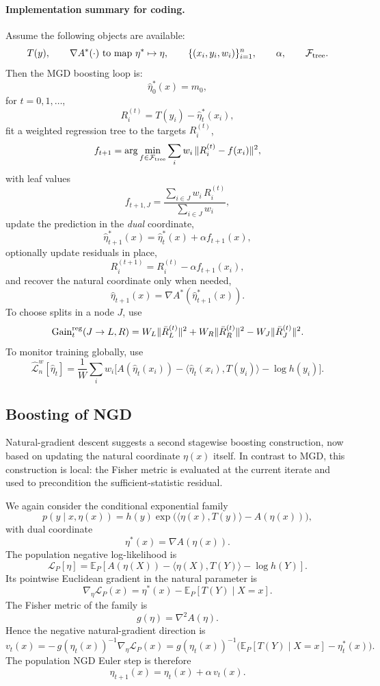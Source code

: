 \documentclass[11pt]{article}
\begin{document}
\paragraph{Implementation summary for coding.}
Assume the following objects are available:
\[
T(y),\qquad
\nabla A^\ast(\cdot)\ \text{to map }\eta^\ast\mapsto \eta,\qquad
\{(x_i,y_i,w_i)\}_{i=1}^n,\qquad
\alpha,\qquad
\mathcal F_{\rm tree}.
\]
Then the MGD boosting loop is:
\[
\hat\eta_0^\ast(x)=m_0,
\]
for \(t=0,1,\dots\),
\[
R_i^{(t)}=T(y_i)-\hat\eta_t^\ast(x_i),
\]
fit a weighted regression tree to the targets \(R_i^{(t)}\),
\[
f_{t+1}
=
\arg\min_{f\in\mathcal F_{\rm tree}}
\sum_i w_i\,\|R_i^{(t)}-f(x_i)\|^2,
\]
with leaf values
\[
f_{t+1,J}=\frac{\sum_{i\in J}w_i\,R_i^{(t)}}{\sum_{i\in J}w_i},
\]
update the prediction in the \emph{dual} coordinate,
\[
\hat\eta_{t+1}^\ast(x)=\hat\eta_t^\ast(x)+\alpha f_{t+1}(x),
\]
optionally update residuals in place,
\[
R_i^{(t+1)}=R_i^{(t)}-\alpha f_{t+1}(x_i),
\]
and recover the natural coordinate only when needed,
\[
\hat\eta_{t+1}(x)=\nabla A^\ast(\hat\eta_{t+1}^\ast(x)).
\]
To choose splits in a node \(J\), use
\[
\mathrm{Gain}^{\rm reg}_t(J\to L,R)
=
W_L\|\bar R_L^{(t)}\|^2+W_R\|\bar R_R^{(t)}\|^2-W_J\|\bar R_J^{(t)}\|^2.
\]
To monitor training globally, use
\[
\widehat{\mathcal L}_n^w[\hat\eta_t]
=
\frac{1}{W}\sum_i
w_i\Big[A(\hat\eta_t(x_i))-\langle \hat\eta_t(x_i),T(y_i)\rangle-\log h(y_i)\Big].
\]

\subsection{Boosting of NGD}

Natural-gradient descent suggests a second stagewise boosting construction, now based on updating the natural coordinate \(\eta(x)\) itself. In contrast to MGD, this construction is local: the Fisher metric is evaluated at the current iterate and used to precondition the sufficient-statistic residual.

We again consider the conditional exponential family
\[
p(y\mid x,\eta(x))
=
h(y)\exp\!\big(\langle \eta(x),T(y)\rangle-A(\eta(x))\big),
\]
with dual coordinate
\[
\eta^\ast(x)=\nabla A(\eta(x)).
\]
The population negative log-likelihood is
\[
\mathcal L_P[\eta]
=
\mathbb E_P\!\left[A(\eta(X))-\langle \eta(X),T(Y)\rangle-\log h(Y)\right].
\]
Its pointwise Euclidean gradient in the natural parameter is
\[
\nabla_\eta \mathcal L_P(x)
=
\eta^\ast(x)-\mathbb E_P[T(Y)\mid X=x].
\]
The Fisher metric of the family is
\[
g(\eta)=\nabla^2 A(\eta).
\]
Hence the negative natural-gradient direction is
\[
v_t(x)
=
-\,g(\eta_t(x))^{-1}\nabla_\eta \mathcal L_P(x)
=
g(\eta_t(x))^{-1}\Big(\mathbb E_P[T(Y)\mid X=x]-\eta_t^\ast(x)\Big).
\]
The population NGD Euler step is therefore
\[
\eta_{t+1}(x)=\eta_t(x)+\alpha\,v_t(x).
\]
\end{document}
